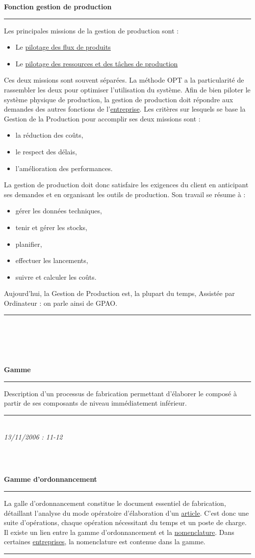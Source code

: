 \documentclass[12pt,a4paper,twoside]{article}
\newcommand{\definition}[3]{
	\begin{minipage}{\textwidth}
		\textbf{\large{#1}}\\
		\rule{\textwidth}{0.5pt}
		#2\\
		\ifthenelse{\isempty{#3}}%
	    {}%
	    {\rule{\textwidth}{0.25pt}\\\textit{#3}}%
    \end{minipage}
    \\\\
}
\begin{document}
\definition{Fonction gestion de production}
{
	Les principales missions de la gestion de production sont : 
	\begin{itemize}
		\item Le \href{http://gpr.insa-lyon.fr/supgedem/Home/Le_monde_industriel/L_entreprise/La_gestion_de_production/Le_pilotage_du_flux_des_produits/pilotageflux.htm}{pilotage des flux de produits}
		\item Le \href{http://gpr.insa-lyon.fr/supgedem/Home/Le_monde_industriel/L_entreprise/La_gestion_de_production/Le_pilotage_des_taches_et_des_ressources/pilotageressources.htm}{pilotage des ressources et des tâches de production}
	\end{itemize}
	
	Ces deux missions sont souvent séparées. La méthode OPT a la particularité de rassembler les deux pour optimiser l'utilisation du système. Afin de bien piloter le système physique de production, la gestion de production doit répondre aux demandes des autres fonctions de l'\href{http://gpr.insa-lyon.fr/supgedem/Home/Le_monde_industriel/L_entreprise/lentreprise.htm}{entreprise}.
Les critères sur lesquels se base la Gestion de la Production pour accomplir ses deux missions sont :
\begin{itemize}
\item la réduction des coûts,
\item le respect des délais,
\item l'amélioration des performances.
\end{itemize}
La gestion de production doit donc satisfaire les exigences du client en anticipant ses demandes et en organisant les outils de production. Son travail se résume à :
\begin{itemize}
\item gérer les données techniques,
\item tenir et gérer les stocks,
\item planifier,
\item effectuer les lancements,
\item suivre et calculer les coûts.
\end{itemize}
Aujourd'hui, la Gestion de Production est, la plupart du temps, Assistée par Ordinateur : on parle ainsi de GPAO.
	}{}
	
\definition{Gamme}
{
	Description d'un processus de fabrication permettant d'élaborer le composé à partir de ses composants de niveau immédiatement inférieur.
	}{13/11/2006 : 11-12}
	
\definition{Gamme d'ordonnancement}
{
	La galle d'ordonnancement constitue le document essentiel de fabrication, détaillant l'analyse du mode opératoire d'élaboration d'un \href{http://gpr.insa-lyon.fr/supgedem/Home/glossaire/garticle.htm}{article}.
C'est donc une suite d'opérations, chaque opération nécessitant du temps et un poste de charge.\\
Il existe un lien entre la gamme d'ordonnancement et la \href{http://gpr.insa-lyon.fr/supgedem/Home/Le_monde_industriel/L_entreprise/L_etude_industrialisation/nomenclature.htm}{nomenclature}. Dans certaines \href{http://gpr.insa-lyon.fr/supgedem/Home/Le_monde_industriel/L_entreprise/lentreprise.htm}{entreprises}, la nomenclature est contenue dans la gamme.
	}{}
		
\end{document}
